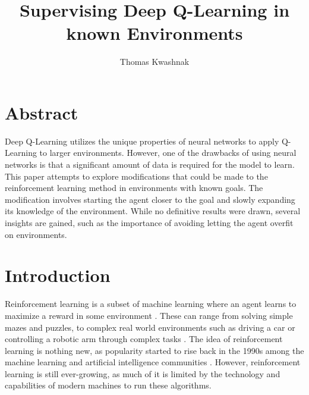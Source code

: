\documentclass[12pt,letterpaper]{article}
\author{Thomas Kwashnak}
\title{Supervising Deep Q-Learning in known Environments}
\begin{document}
\maketitle

\newpage

\section{Abstract}

Deep Q-Learning utilizes the unique properties of neural networks to apply Q-Learning to larger environments.
However, one of the drawbacks of using neural networks is that a significant amount of data is required for the model to learn. 
This paper attempts to explore modifications that could be made to the reinforcement learning method in environments with known goals.
The modification involves starting the agent closer to the goal and slowly expanding its knowledge of the environment.
While no definitive results were drawn, several insights are gained, such as the importance of avoiding letting the agent overfit on environments.

\section{Introduction}

Reinforcement learning is a subset of machine learning where an agent learns to maximize a reward in some environment \cite{article_reinforcement_learning_survey}.
These can range from solving simple mazes and puzzles, to complex real world environments such as driving a car or controlling a robotic arm through complex tasks \cite{article_deep_learning_hybrid_quantum}.
The idea of reinforcement learning is nothing new, as popularity started to rise back in the 1990s among the machine learning and artificial intelligence communities \cite{article_reinforcement_learning_survey}.
However, reinforcement learning is still ever-growing, as much of it is limited by the technology and capabilities of modern machines to run these algorithms.
\end{document}
